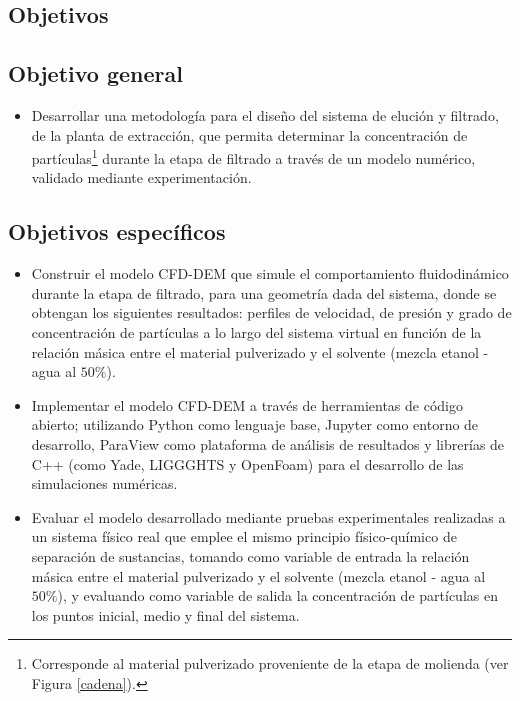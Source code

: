 \begin{center}
	\section{Objetivos}
\end{center}

\subsection{Objetivo general}

\begin{itemize}
	\item Desarrollar una metodolog\'ia para el dise\~no del sistema de eluci\'on y filtrado, de la planta de extracci\'on, que permita determinar la concentraci\'on de part\'iculas\footnote{Corresponde al material pulverizado proveniente de la etapa de molienda (ver Figura \ref{cadena}).} durante la etapa de filtrado a trav\'es de un modelo num\'erico, validado mediante experimentaci\'on.
\end{itemize}

\subsection{Objetivos espec\'ificos}

\begin{itemize}
	\item Construir el modelo CFD-DEM que simule el comportamiento fluidodin\'amico durante la etapa de filtrado, para una geometr\'ia dada del sistema, donde se obtengan los siguientes resultados: perfiles de velocidad, de presi\'on y grado de concentraci\'on de part\'iculas a lo largo del sistema virtual en funci\'on de la relaci\'on m\'asica entre el material pulverizado y el solvente (mezcla etanol - agua al $50\%$).
	\item Implementar el modelo CFD-DEM a trav\'es de herramientas de c\'odigo abierto; utilizando Python como lenguaje base, Jupyter como entorno de desarrollo, ParaView como plataforma de an\'alisis de resultados y librer\'ias de C++ (como Yade, LIGGGHTS y OpenFoam) para el desarrollo de las simulaciones num\'ericas.
	\item Evaluar el modelo desarrollado mediante pruebas experimentales realizadas a un sistema f\'isico real que emplee el mismo principio f\'isico-qu\'imico de separaci\'on de sustancias, tomando como variable de entrada la relaci\'on m\'asica entre el material pulverizado y el solvente (mezcla etanol - agua al $50\%$), y evaluando como variable de salida la concentraci\'on de part\'iculas en los puntos inicial, medio y final del sistema.
\end{itemize}